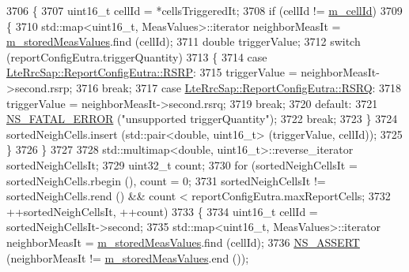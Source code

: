 \begin{DoxyCode}
3706             \{
3707               uint16\_t cellId = *cellsTriggeredIt;
3708               \textcolor{keywordflow}{if} (cellId != \hyperlink{classns3_1_1LteUeRrc_aa9d3317734eea9158371d9fccf3a0c48}{m\_cellId})
3709                 \{
3710                   std::map<uint16\_t, MeasValues>::iterator neighborMeasIt = 
      \hyperlink{classns3_1_1LteUeRrc_a93094dcd5c235b2e2a8a299125100a57}{m\_storedMeasValues}.find (cellId);
3711                   \textcolor{keywordtype}{double} triggerValue;
3712                   \textcolor{keywordflow}{switch} (reportConfigEutra.triggerQuantity)
3713                     \{
3714                     \textcolor{keywordflow}{case} \hyperlink{structns3_1_1LteRrcSap_1_1ReportConfigEutra_a82343ddf526faba0483431ea5882a3efa5b7591e86ab7bcefc7fe1528762114d7}{LteRrcSap::ReportConfigEutra::RSRP}:
3715                       triggerValue = neighborMeasIt->second.rsrp;
3716                       \textcolor{keywordflow}{break};
3717                     \textcolor{keywordflow}{case} \hyperlink{structns3_1_1LteRrcSap_1_1ReportConfigEutra_a82343ddf526faba0483431ea5882a3efaa4e09cb3c7154d7ab732115a2647325f}{LteRrcSap::ReportConfigEutra::RSRQ}:
3718                       triggerValue = neighborMeasIt->second.rsrq;
3719                       \textcolor{keywordflow}{break};
3720                     \textcolor{keywordflow}{default}:
3721                       \hyperlink{group__fatal_ga5131d5e3f75d7d4cbfd706ac456fdc85}{NS\_FATAL\_ERROR} (\textcolor{stringliteral}{"unsupported triggerQuantity"});
3722                       \textcolor{keywordflow}{break};
3723                     \}
3724                   sortedNeighCells.insert (std::pair<double, uint16\_t> (triggerValue, cellId));
3725                 \}
3726             \}
3727 
3728           std::multimap<double, uint16\_t>::reverse\_iterator sortedNeighCellsIt;
3729           uint32\_t count;
3730           \textcolor{keywordflow}{for} (sortedNeighCellsIt = sortedNeighCells.rbegin (), count = 0;
3731                sortedNeighCellsIt != sortedNeighCells.rend () && count < reportConfigEutra.maxReportCells;
3732                ++sortedNeighCellsIt, ++count)
3733             \{
3734               uint16\_t cellId = sortedNeighCellsIt->second;
3735               std::map<uint16\_t, MeasValues>::iterator neighborMeasIt = 
      \hyperlink{classns3_1_1LteUeRrc_a93094dcd5c235b2e2a8a299125100a57}{m\_storedMeasValues}.find (cellId);
3736               \hyperlink{assert_8h_a6dccdb0de9b252f60088ce281c49d052}{NS\_ASSERT} (neighborMeasIt != \hyperlink{classns3_1_1LteUeRrc_a93094dcd5c235b2e2a8a299125100a57}{m\_storedMeasValues}.end ());

\end{DoxyCode}
